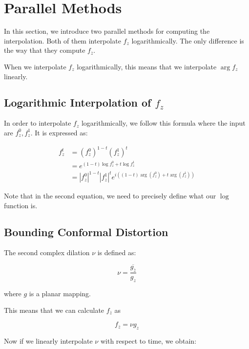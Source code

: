 \section{Parallel Methods}

In this section, we introduce two parallel methods for computing the interpolation. Both of them interpolate $f_z$ logarithmically. The only difference is the way that they compute $f_{\overline{z}}$. 

When we interpolate $f_z$ logarithmically, this means that we interpolate $\arg f_z$ linearly. 

\subsection{Logarithmic Interpolation of $f_z$}

In order to interpolate $f_z$ logarithmically, we follow this formula where the input are $f_z^0, f_z^1$. It is expressed as:

\begin{align*}
f_z^t &= (f_z^0)^{1-t} (f_z^1)^t \\
&= e^{(1-t) \log f_z^0 + t \log f_z^1} \\
&= |f_z^0|^{1-t} |f_z^1|^{t} e^{i \left( (1-t) \arg(f_z^0) + t \arg(f_z^1) \right)}
\end{align*}

Note that in the second equation, we need to precisely define what our $\log$ function is. 



\subsection{Bounding Conformal Distortion}

The second complex dilation $\nu$ is defined as:

\begin{equation}
\nu = \frac{\overline{g_{\overline{z}}}}{g_z}
\end{equation}

where $g$ is a planar mapping. 


This means that we can calculate $f_{\overline{z}}$ as 

$$f_{\overline{z}} = \nu g_z$$

Now if we linearly interpolate $\nu$ with respect to time, we obtain:

